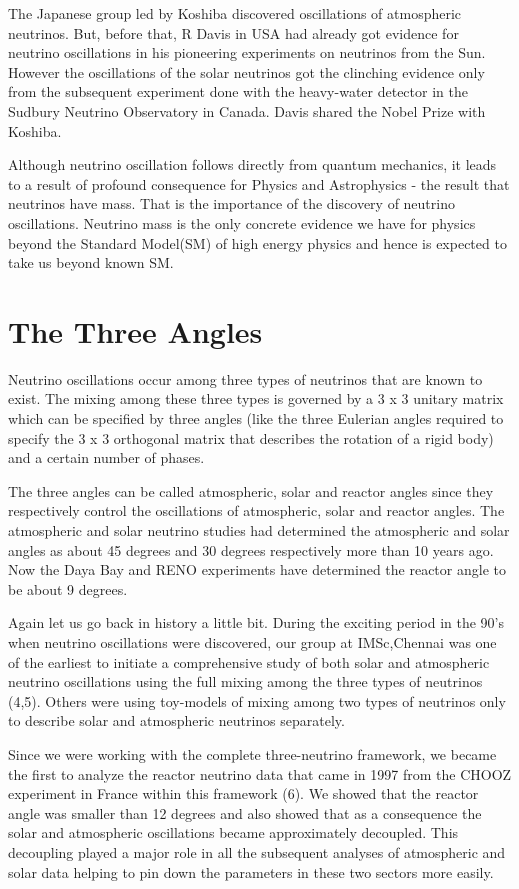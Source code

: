 The Japanese group led by Koshiba discovered oscillations of 
atmospheric neutrinos. But, before that, R Davis in USA had already
got evidence for neutrino oscillations in his pioneering
experiments on neutrinos from the Sun. However the oscillations of
the solar neutrinos got the clinching evidence only from the
subsequent experiment done with the heavy-water detector in
the Sudbury Neutrino Observatory in Canada. Davis shared 
the Nobel Prize with Koshiba.

Although neutrino oscillation follows directly from quantum
mechanics, it leads to a result of profound consequence for
Physics and Astrophysics - the result that neutrinos have mass.
That is the importance of the discovery of neutrino oscillations.
Neutrino mass is the only concrete evidence we have for physics
beyond the Standard Model(SM) of high energy physics and hence is
expected to take us beyond known SM.

\section*{The Three Angles}

Neutrino oscillations occur among three types of neutrinos
that are known to exist. The mixing among these three types
is governed by a 3 x 3 unitary matrix which can be specified
by three angles (like the three Eulerian angles required
to specify the 3 x 3 orthogonal matrix that describes the
rotation of a rigid body) and a certain number of phases.

The three angles can be called atmospheric, solar and
reactor angles since they respectively control the oscillations
of atmospheric, solar and reactor angles. The atmospheric 
and solar neutrino studies had determined the atmospheric and 
solar angles as about 45 degrees and 30 degrees respectively more 
than 10 years ago. Now the Daya Bay and RENO experiments have 
determined the reactor angle to be about 9 degrees.

Again let us go back in history a little bit. During the exciting
period in the 90's when neutrino oscillations were discovered,
our group at IMSc,Chennai was one of the earliest to initiate a
comprehensive study of both solar and atmospheric neutrino 
oscillations using the full mixing among the three types of 
neutrinos (4,5). Others were using toy-models of mixing among 
two types of neutrinos only to describe solar and atmospheric 
neutrinos separately.

Since we were working with the complete three-neutrino framework,
we became the first to analyze the reactor neutrino data
that came in 1997 from the CHOOZ experiment in France
within this framework (6). We showed that the reactor angle 
was smaller than 12 degrees and also showed that as a consequence  
the solar and atmospheric oscillations became approximately
decoupled. This decoupling played a major role in all the 
subsequent analyses of atmospheric and solar data helping to pin 
down the parameters in these two sectors more easily.

